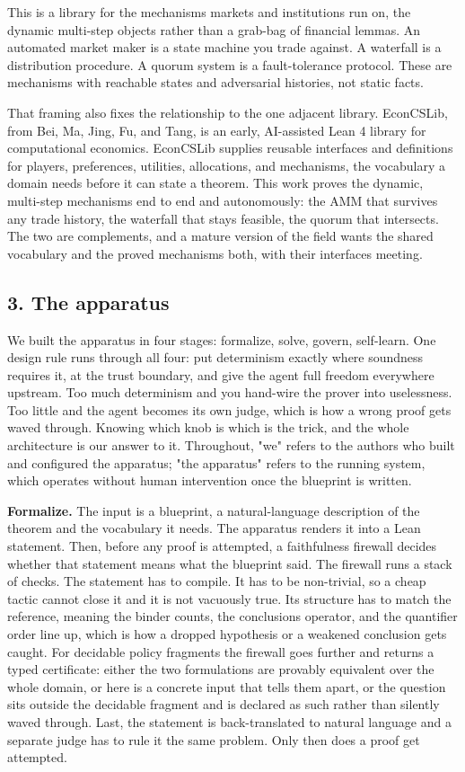 \documentclass[
  11pt,
]{article}
\renewcommand{\_}{\origunderscore\allowbreak}
\begin{document}
This is a library for the mechanisms markets and institutions run on,
the dynamic multi-step objects rather than a grab-bag of financial
lemmas. An automated market maker is a state machine you trade against.
A waterfall is a distribution procedure. A quorum system is a
fault-tolerance protocol. These are mechanisms with reachable states and
adversarial histories, not static facts.

That framing also fixes the relationship to the one adjacent library.
EconCSLib, from Bei, Ma, Jing, Fu, and Tang, is an early, AI-assisted
Lean 4 library for computational economics. EconCSLib supplies reusable
interfaces and definitions for players, preferences, utilities,
allocations, and mechanisms, the vocabulary a domain needs before it can
state a theorem. This work proves the dynamic, multi-step mechanisms end
to end and autonomously: the AMM that survives any trade history, the
waterfall that stays feasible, the quorum that intersects. The two are
complements, and a mature version of the field wants the shared
vocabulary and the proved mechanisms both, with their interfaces
meeting.

\subsection{3. The apparatus}\label{3-the-apparatus}

We built the apparatus in four stages: formalize, solve, govern,
self-learn. One design rule runs through all four: put determinism
exactly where soundness requires it, at the trust boundary, and give the
agent full freedom everywhere upstream. Too much determinism and you
hand-wire the prover into uselessness. Too little and the agent becomes
its own judge, which is how a wrong proof gets waved through. Knowing
which knob is which is the trick, and the whole architecture is our
answer to it. Throughout, "we" refers to the authors who built and
configured the apparatus; "the apparatus" refers to the running system,
which operates without human intervention once the blueprint is written.

\textbf{Formalize.} The input is a blueprint, a natural-language
description of the theorem and the vocabulary it needs. The apparatus
renders it into a Lean statement. Then, before any proof is attempted, a
faithfulness firewall decides whether that statement means what the
blueprint said. The firewall runs a stack of checks. The statement has
to compile. It has to be non-trivial, so a cheap tactic cannot close it
and it is not vacuously true. Its structure has to match the reference,
meaning the binder counts, the conclusion\textquotesingle s operator,
and the quantifier order line up, which is how a dropped hypothesis or a
weakened conclusion gets caught. For decidable policy fragments the
firewall goes further and returns a typed certificate: either the two
formulations are provably equivalent over the whole domain, or here is a
concrete input that tells them apart, or the question sits outside the
decidable fragment and is declared as such rather than silently waved
through. Last, the statement is back-translated to natural language and
a separate judge has to rule it the same problem. Only then does a proof
get attempted.
\end{document}
